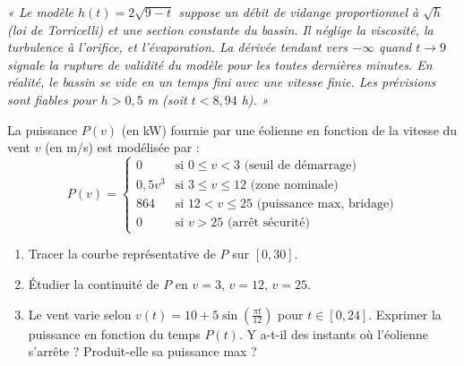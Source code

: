 \documentclass[11pt]{article}
\begin{document}
\begin{exemplebox}
\textit{« Le modèle $h(t)=2\sqrt{9-t}$ suppose un débit de vidange proportionnel à $\sqrt{h}$ (loi de Torricelli) et une section constante du bassin. Il néglige la viscosité, la turbulence à l'orifice, et l'évaporation. La dérivée tendant vers $-\infty$ quand $t\to 9$ signale la rupture de validité du modèle pour les toutes dernières minutes. En réalité, le bassin se vide en un temps fini avec une vitesse finie. Les prévisions sont fiables pour $h > 0,5$ m (soit $t < 8,94$ h). »}
\end{exemplebox}

\begin{exercice}
La puissance $P(v)$ (en kW) fournie par une éolienne en fonction de la vitesse du vent $v$ (en m/s) est modélisée par :
\[ P(v) = \begin{cases}
0 & \text{si } 0 \le v < 3 \text{ (seuil de démarrage)} \\
0,5 v^3 & \text{si } 3 \le v \le 12 \text{ (zone nominale)} \\
864 & \text{si } 12 < v \le 25 \text{ (puissance max, bridage)} \\
0 & \text{si } v > 25 \text{ (arrêt sécurité)}
\end{cases} \]
\begin{enumerate}
    \item Tracer la courbe représentative de $P$ sur $[0, 30]$.
    \item Étudier la continuité de $P$ en $v=3$, $v=12$, $v=25$.
    \item Le vent varie selon $v(t) = 10 + 5\sin(\frac{\pi t}{12})$ pour $t \in [0, 24]$. Exprimer la puissance en fonction du temps $P(t)$. Y a-t-il des instants où l'éolienne s'arrête ? Produit-elle sa puissance max ?
\end{enumerate}
\end{exercice}
\end{document}
